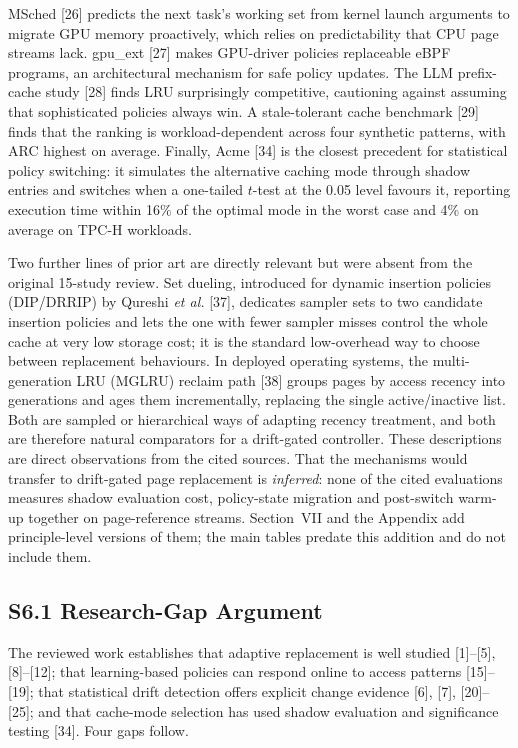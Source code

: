 \documentclass[journal,onecolumn]{IEEEtran}
\begin{document}
MSched [26] predicts the next task's working set from kernel launch arguments
to migrate GPU memory proactively, which relies on predictability that CPU page
streams lack. gpu\_ext [27] makes GPU-driver policies replaceable eBPF
programs, an architectural mechanism for safe policy updates. The LLM
prefix-cache study [28] finds LRU surprisingly competitive, cautioning against
assuming that sophisticated policies always win. A stale-tolerant cache
benchmark [29] finds that the ranking is workload-dependent across four
synthetic patterns, with ARC highest on average. Finally, Acme [34] is the closest precedent for statistical policy
switching: it simulates the alternative caching mode through shadow entries and
switches when a one-tailed $t$-test at the 0.05 level favours it, reporting
execution time within 16\% of the optimal mode in the worst case and 4\% on
average on TPC-H workloads.

Two further lines of prior art are directly relevant but were absent from the
original 15-study review. Set dueling, introduced for dynamic insertion
policies (DIP/DRRIP) by Qureshi \emph{et al.} [37], dedicates sampler sets to
two candidate insertion policies and lets the one with fewer sampler misses
control the whole cache at very low storage cost; it is the standard
low-overhead way to choose between replacement behaviours. In deployed
operating systems, the multi-generation LRU (MGLRU) reclaim path [38] groups
pages by access recency into generations and ages them incrementally, replacing
the single active/inactive list. Both are sampled or hierarchical ways of
adapting recency treatment, and both are therefore natural comparators for a
drift-gated controller. These descriptions are direct observations from the
cited sources. That the mechanisms would transfer to drift-gated page
replacement is \emph{inferred}: none of the cited evaluations measures shadow
evaluation cost, policy-state migration and post-switch warm-up together on
page-reference streams. Section~VII and the Appendix add principle-level
versions of them; the main tables predate this addition and do not include
them.


\subsection*{S6.1 Research-Gap Argument}
The reviewed work establishes that adaptive replacement is well studied
[1]--[5], [8]--[12]; that learning-based policies can respond online to
access patterns [15]--[19]; that statistical drift detection offers explicit
change evidence [6], [7], [20]--[25]; and that cache-mode selection has used
shadow evaluation and significance testing [34]. Four gaps follow.
\end{document}

